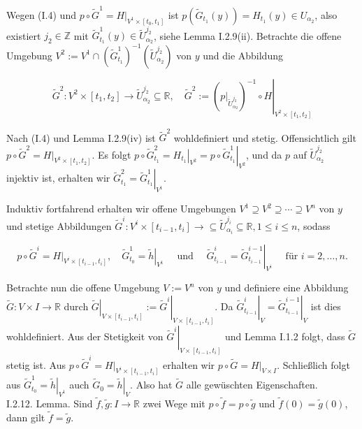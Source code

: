 \documentclass[10pt]{article}
\begin{document}
Wegen (I.4) und $p \circ \tilde{G}^{1}=\left.H\right|_{V^{1} \times\left[t_{0}, t_{1}\right]}$ ist $p\left(\tilde{G}_{t_{1}}(y)\right)=H_{t_{1}}(y) \in U_{\alpha_{2}}$, also existiert $j_{2} \in \mathbb{Z}$ mit $\tilde{G}_{t_{1}}^{1}(y) \in \tilde{U}_{\alpha_{2}}^{j_{2}}$, siehe Lemma I.2.9(ii). Betrachte die offene Umgebung $V^{2}:=V^{1} \cap\left(\tilde{G}_{t_{1}}^{1}\right)^{-1}\left(\tilde{U}_{\alpha_{2}}^{j_{2}}\right)$ von $y$ und die Abbildung

$$
\tilde{G}^{2}: V^{2} \times\left[t_{1}, t_{2}\right] \rightarrow \tilde{U}_{\alpha_{2}}^{j_{2}} \subseteq \mathbb{R}, \quad \tilde{G}^{2}:=\left.\left(\left.p\right|_{\tilde{U}_{\alpha_{2}}^{j_{2}}}\right)^{-1} \circ H\right|_{V^{2} \times\left[t_{1}, t_{2}\right]}
$$

Nach (I.4) und Lemma I.2.9(iv) ist $\tilde{G}^{2}$ wohldefiniert und stetig. Offensichtlich gilt $p \circ \tilde{G}^{2}=\left.H\right|_{V^{2} \times\left[t_{1}, t_{2}\right]}$. Es folgt $p \circ \tilde{G}_{t_{1}}^{2}=\left.H_{t_{1}}\right|_{V^{2}}=\left.p \circ \tilde{G}_{t_{1}}^{1}\right|_{V^{2}}$, und da $p$ auf $\tilde{U}_{\alpha_{2}}^{j_{2}}$ injektiv ist, erhalten wir $\tilde{G}_{t_{1}}^{2}=\left.\tilde{G}_{t_{1}}^{1}\right|_{V^{1}}$.

Induktiv fortfahrend erhalten wir offene Umgebungen $V^{1} \supseteq V^{2} \supseteq \cdots \supseteq V^{n}$ von $y$ und stetige Abbildungen $\tilde{G}^{i}: V^{i} \times\left[t_{i-1}, t_{i}\right] \rightarrow \subseteq \tilde{U}_{\alpha_{i}}^{j_{i}} \subseteq \mathbb{R}, 1 \leq i \leq n$, sodass

$$
p \circ \tilde{G}^{i}=\left.H\right|_{V^{i} \times\left[t_{i-1}, t_{i}\right]}, \quad \tilde{G}_{t_{0}}^{1}=\left.\tilde{h}\right|_{V^{1}} \quad \text { und } \quad \tilde{G}_{t_{i-1}}^{i}=\left.\tilde{G}_{t_{i-1}}^{i-1}\right|_{V^{i}} \quad \text { für } i=2, \ldots, n .
$$

Betrachte nun die offene Umgebung $V:=V^{n}$ von $y$ und definiere eine Abbildung $\tilde{G}: V \times I \rightarrow \mathbb{R}$ durch $\left.\tilde{G}\right|_{V \times\left[t_{i-1}, t_{i}\right]}:=\left.\tilde{G}^{i}\right|_{V \times\left[t_{i-1}, t_{i}\right]}$. Da $\left.\tilde{G}_{t_{i-1}}^{i}\right|_{V}=\left.\tilde{G}_{t_{i-1}}^{i-1}\right|_{V}$ ist dies wohldefiniert. Aus der Stetigkeit von $\left.\tilde{G}^{i}\right|_{V \times\left[t_{i-1}, t_{i}\right]}$ und Lemma I.1.2 folgt, dass $\tilde{G}$ stetig ist. Aus $p \circ \tilde{G}^{i}=\left.H\right|_{V^{i} \times\left[t_{i-1}, t_{i}\right]}$ erhalten wir $p \circ \tilde{G}=\left.H\right|_{V \times I}$. Schließlich folgt aus $\tilde{G}_{t_{0}}^{1}=\left.\tilde{h}\right|_{V^{1}}$ auch $\tilde{G}_{0}=\left.\tilde{h}\right|_{V}$. Also hat $\tilde{G}$ alle gewüschten Eigenschaften.\\
I.2.12. Lemma. Sind $\tilde{f}, \tilde{g}: I \rightarrow \mathbb{R}$ zwei Wege mit $p \circ \tilde{f}=p \circ \tilde{g}$ und $\tilde{f}(0)=\tilde{g}(0)$, dann gilt $\tilde{f}=\tilde{g}$.
\end{document}

